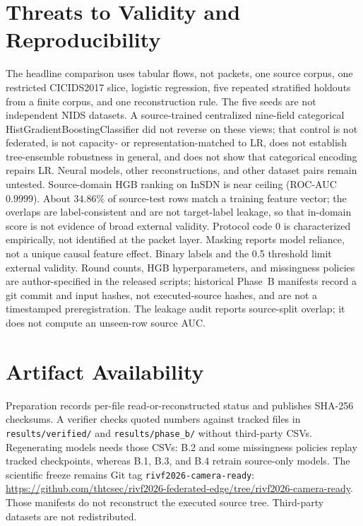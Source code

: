 \documentclass[conference,a4paper]{IEEEtran}
\begin{document}
\section{Threats to Validity and Reproducibility}
The headline comparison uses tabular flows, not packets, one source corpus, one restricted CICIDS2017 slice, logistic regression, five repeated stratified holdouts from a finite corpus, and one reconstruction rule. The five seeds are not independent NIDS datasets. A source-trained centralized nine-field categorical HistGradientBoostingClassifier did not reverse on these views; that control is not federated, is not capacity- or representation-matched to LR, does not establish tree-ensemble robustness in general, and does not show that categorical encoding repairs LR. Neural models, other reconstructions, and other dataset pairs remain untested. Source-domain HGB ranking on InSDN is near ceiling (ROC-AUC $0.9999$). About $34.86\%$ of source-test rows match a training feature vector; the overlaps are label-consistent and are not target-label leakage, so that in-domain score is not evidence of broad external validity. Protocol code 0 is characterized empirically, not identified at the packet layer. Masking reports model reliance, not a unique causal feature effect. Binary labels and the 0.5 threshold limit external validity. Round counts, HGB hyperparameters, and missingness policies are author-specified in the released scripts; historical Phase~B manifests record a git commit and input hashes, not executed-source hashes, and are not a timestamped preregistration. The leakage audit reports source-split overlap; it does not compute an unseen-row source AUC.

\section{Artifact Availability}
Preparation records per-file read-or-reconstructed status and publishes SHA-256 checksums. A verifier checks quoted numbers against tracked files in \texttt{results/verified/} and \texttt{results/phase\_b/} without third-party CSVs. Regenerating models needs those CSVs: B.2 and some missingness policies replay tracked checkpoints, whereas B.1, B.3, and B.4 retrain source-only models. The scientific freeze remains Git tag \texttt{rivf2026-camera-ready}: \url{https://github.com/thtcsec/rivf2026-federated-edge/tree/rivf2026-camera-ready}. Those manifests do not reconstruct the executed source tree. Third-party datasets are not redistributed.
\end{document}
